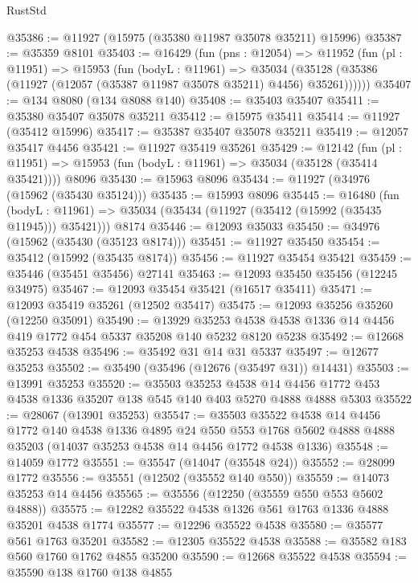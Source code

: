 \begin{lexlean}{RustStd}
\begin{coremodule}
@35386 := @11927 (@15975 (@35380 @11987 @35078 @35211) @15996)
@35387 := @35359 @8101
@35403 := @16429
    (fun (pns : @12054) =>
    @11952
      (fun (pl : @11951) =>
      @15953
        (fun (bodyL : @11961) =>
        @35034 (@35128 (@35386 (@11927 (@12057 (@35387 @11987 @35078 @35211) @4456) @35261))))))
@35407 := @134 @8080 (@134 @8088 @140)
@35408 := @35403 @35407
@35411 := @35380 @35407 @35078 @35211
@35412 := @15975 @35411
@35414 := @11927 (@35412 @15996)
@35417 := @35387 @35407 @35078 @35211
@35419 := @12057 @35417 @4456
@35421 := @11927 @35419 @35261
@35429 := @12142
    (fun (pl : @11951) => @15953 (fun (bodyL : @11961) => @35034 (@35128 (@35414 @35421))))
    @8096
@35430 := @15963 @8096
@35434 := @11927 (@34976 (@15962 (@35430 @35124)))
@35435 := @15993 @8096
@35445 := @16480
    (fun (bodyL : @11961) => @35034 (@35434 (@11927 (@35412 (@15992 (@35435 @11945))) @35421)))
    @8174
@35446 := @12093 @35033
@35450 := @34976 (@15962 (@35430 (@35123 @8174)))
@35451 := @11927 @35450
@35454 := @35412 (@15992 (@35435 @8174))
@35456 := @11927 @35454 @35421
@35459 := @35446 (@35451 @35456) @27141
@35463 := @12093 @35450 @35456 (@12245 @34975)
@35467 := @12093 @35454 @35421 (@16517 @35411)
@35471 := @12093 @35419 @35261 (@12502 @35417)
@35475 := @12093 @35256 @35260 (@12250 @35091)
@35490 := @13929
    @35253
    @4538
    @4538
    @1336
    @14
    @4456
    @419
    @1772
    @454
    @5337
    @35208
    @140
    @5232
    @8120
    @5238
@35492 := @12668 @35253 @4538
@35496 := @35492 @31 @14 @31 @5337
@35497 := @12677 @35253
@35502 := @35490 (@35496 (@12676 (@35497 @31)) @14431)
@35503 := @13991 @35253
@35520 := @35503
    @35253
    @4538
    @14
    @4456
    @1772
    @453
    @4538
    @1336
    @35207
    @138
    @545
    @140
    @403
    @5270
    @4888
    @4888
    @5303
@35522 := @28067 (@13901 @35253)
@35547 := @35503
    @35522
    @4538
    @14
    @4456
    @1772
    @140
    @4538
    @1336
    @4895
    @24
    @550
    @553
    @1768
    @5602
    @4888
    @4888
    @35203
    (@14037 @35253 @4538 @14 @4456 @1772 @4538 @1336)
@35548 := @14059 @1772
@35551 := @35547 (@14047 (@35548 @24))
@35552 := @28099 @1772
@35556 := @35551 (@12502 (@35552 @140 @550))
@35559 := @14073 @35253 @14 @4456
@35565 := @35556 (@12250 (@35559 @550 @553 @5602 @4888))
@35575 := @12282 @35522 @4538 @1326 @561 @1763 @1336 @4888 @35201 @4538 @1774
@35577 := @12296 @35522 @4538
@35580 := @35577 @561 @1763 @35201
@35582 := @12305 @35522 @4538
@35588 := @35582 @183 @560 @1760 @1762 @4855 @35200
@35590 := @12668 @35522 @4538
@35594 := @35590 @138 @1760 @138 @4855

\end{coremodule}
\end{lexlean}
